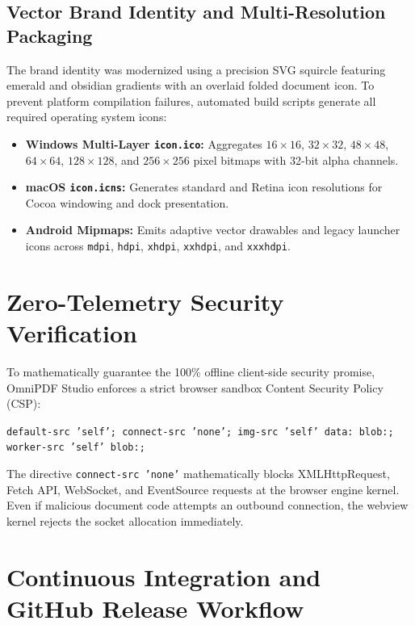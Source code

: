 \documentclass[11pt,a4paper]{article}
\begin{document}
\subsection{Vector Brand Identity and Multi-Resolution Packaging}
The brand identity was modernized using a precision SVG squircle featuring emerald and obsidian gradients with an overlaid folded document icon. To prevent platform compilation failures, automated build scripts generate all required operating system icons:
\begin{itemize}
    \item \textbf{Windows Multi-Layer \texttt{icon.ico}:} Aggregates $16\times 16$, $32\times 32$, $48\times 48$, $64\times 64$, $128\times 128$, and $256\times 256$ pixel bitmaps with 32-bit alpha channels.
    \item \textbf{macOS \texttt{icon.icns}:} Generates standard and Retina icon resolutions for Cocoa windowing and dock presentation.
    \item \textbf{Android Mipmaps:} Emits adaptive vector drawables and legacy launcher icons across \texttt{mdpi}, \texttt{hdpi}, \texttt{xhdpi}, \texttt{xxhdpi}, and \texttt{xxxhdpi}.
\end{itemize}

\section{Zero-Telemetry Security Verification}
\label{sec:security}

To mathematically guarantee the 100\% offline client-side security promise, OmniPDF Studio enforces a strict browser sandbox Content Security Policy (CSP):
\begin{center}
\small\texttt{default-src 'self'; connect-src 'none'; img-src 'self' data: blob:; worker-src 'self' blob:;}
\end{center}
The directive \texttt{connect-src 'none'} mathematically blocks XMLHttpRequest, Fetch API, WebSocket, and EventSource requests at the browser engine kernel. Even if malicious document code attempts an outbound connection, the webview kernel rejects the socket allocation immediately.

\section{Continuous Integration and GitHub Release Workflow}
\label{sec:ci}
\end{document}
